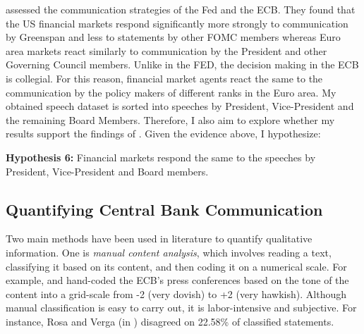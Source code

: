 \textcite{ehrmann2007} assessed the communication strategies of the Fed and the ECB. They found that the US financial markets respond significantly more strongly to communication by Greenspan and less to statements by other FOMC members whereas Euro area markets react similarly to communication by the President and other Governing Council members. Unlike in the FED, the decision making in the ECB is collegial. For this reason, financial market agents react the same to the communication by the policy makers of different ranks in the Euro area. My obtained speech dataset is sorted into speeches by President, Vice-President and the remaining Board Members. Therefore, I also aim to explore whether my results support the findings of \textcite{ehrmann2007}. Given the evidence above, I hypothesize:


\textbf{Hypothesis 6:} Financial markets respond the same to the speeches by President, Vice-President and Board members.



\subsection{Quantifying Central Bank Communication}
Two main methods have been used in literature to quantify qualitative information. One is \textit{manual content analysis}, which involves reading a text, classifying it based on its content, and then coding it on a numerical scale. For example, \textcite{musard-gies2006} and \textcite{rosa2007} hand-coded the ECB’s press conferences based on the tone of the content into a grid-scale from -2 (very dovish) to +2 (very hawkish). Although manual classification is easy to carry out, it is labor-intensive and subjective. For instance, Rosa and Verga (in \cite{rosa2007}) disagreed on 22.58\% of classified statements.


